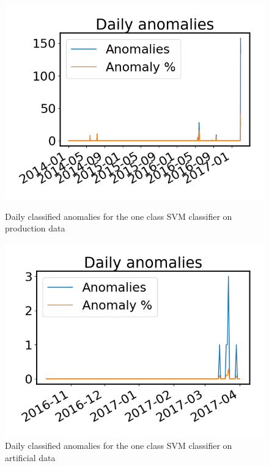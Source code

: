         \begin{figure}
            \begin{minipage}[b]{0.49\linewidth}
                \centering
                \includegraphics[width=\textwidth]{report/figures/analysis/plant1_training/daily_svm_outliers_production_small.png}
                \caption{Daily classified anomalies for the one class SVM classifier on production data}
                \label{fig:svm_1_outliers_stats_production}
            \end{minipage}
            \hfill\vline\hfill
            \begin{minipage}[b]{0.49\linewidth}
                \centering
                \includegraphics[width=\textwidth]{report/figures/analysis/plant1_training/daily_svm_outliers_artificial_small.png}
                \caption{Daily classified anomalies for the one class SVM classifier on artificial data}
                \label{fig:svm_1_outliers_stats_artificial}
            \end{minipage}
        \end{figure}
        
